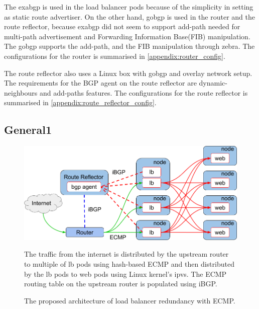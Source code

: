 The exabgp is used in the load balancer pods because of the simplicity in setting as static route advertiser.
On the other hand, gobgp is used in the router and the route reflector, because exabgp did not seem to support add-path\cite{rfc7911} needed for multi-path advertisement and Forwarding Information Base(FIB) manipulation\cite{exa-networks_2018}.
The gobgp supports the add-path, and the FIB manipulation through zebra\cite{osrg_gobgp_zebra}.
The configurations for the router is summarised in \ref{appendix:router_config}.

The route reflector also uses a Linux box with gobgp and overlay network setup.
The requirements for the BGP agent on the route reflector are dynamic-neighbours and add-paths features.
The configurations for the route reflector is summarised in \ref{appendix:route_reflector_config}.

\subsection{General1}

\begin{figure}[tb]
  \centering
  \includegraphics[width=0.8\columnwidth]{Figs/ecmp.png}
\caption{The proposed architecture of load balancer redundancy with ECMP.}

\vspace{1mm}

\begin{minipage}{0.9\columnwidth}
  The traffic from the internet is distributed by the upstream router to multiple of lb pods using hash-based ECMP and then distributed by the lb pods to web pods using Linux kernel's ipvs.
  The ECMP routing table on the upstream router is populated using iBGP.
\end{minipage}
\label{fig:ecmp}
\end{figure}

